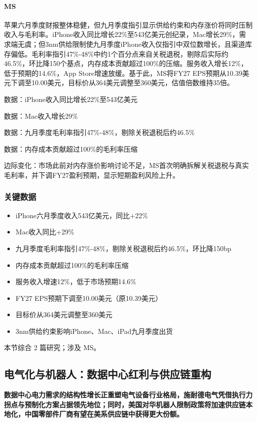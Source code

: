 \documentclass[11pt]{ctexart}
\begin{document}
\paragraph{MS} 苹果六月季度财报整体稳健，但九月季度指引显示供给约束和内存涨价将同时压制收入与毛利率。iPhone收入同比增长22\%至543亿美元创纪录，Mac增长29\%，需求端无虞；但3nm供给限制使九月季度iPhone收入仅指引中双位数增长，且渠道库存偏低。毛利率指引47\%-48\%中约1个百分点来自关税退税，剔除后实际约46.5\%，环比降150个基点，内存成本贡献超过100\%的压缩。服务收入增长12\%，低于预期的14.6\%，App Store增速放缓。基于此，MS将FY27 EPS预期从10.39美元下调至10.00美元，目标价从364美元调整至360美元，估值倍数维持35倍。
{\small\color{refgray}数据：iPhone收入同比增长22\%至543亿美元\par}
{\small\color{refgray}数据：Mac收入增长29\%\par}
{\small\color{refgray}数据：九月季度毛利率指引47\%-48\%，剔除关税退税后约46.5\%\par}
{\small\color{refgray}数据：内存成本贡献超过100\%的毛利率压缩\par}
{\small\color{refgray}边际变化：市场此前对内存涨价影响讨论不足，MS首次明确拆解关税退税与真实毛利率，并下调FY27盈利预期，显示短期盈利风险上升。\par}
\subsubsection*{关键数据}
\begin{itemize}
  \item iPhone六月季度收入543亿美元，同比+22\%
  \item Mac收入同比+29\%
  \item 九月季度毛利率指引47\%-48\%，剔除关税退税后约46.5\%，环比降150bp
  \item 内存成本贡献超过100\%的毛利率压缩
  \item 服务收入增速12\%，低于市场预期14.6\%
  \item FY27 EPS预期下调至10.00美元（原10.39美元）
  \item 目标价从364美元调整至360美元
  \item 3nm供给约束影响iPhone、Mac、iPad九月季度出货
\end{itemize}
{\small\color{refgray}本节综合 2 篇研究；涉及 MS。}
\newpage
\subsection{电气化与机器人：数据中心红利与供应链重构}
\textbf{数据中心电力需求的结构性增长正重塑电气设备行业格局，施耐德电气凭借执行力拐点与预制化方案占据领先地位；同时，美国对华机器人限制政策将加速供应链本地化，中国零部件厂商有望在美系供应链中获得更大份额。}
\end{document}

